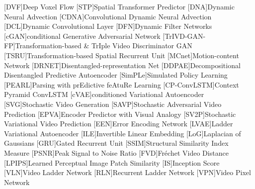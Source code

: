\begin{acronym}
    [DVF]{Deep Voxel Flow}
    [STP]{Spatial Transformer Predictor}
    [DNA]{Dynamic Neural Advection}
    [CDNA]{Convolutional Dynamic Neural Advection}
    [DCL]{Dynamic Convolutional Layer}
    [DFN]{Dynamic Filter Networks}
    [cGAN]{conditional Generative Adversarial Network}
    [TrIVD-GAN-FP]{Transformation-based \& TrIple Video Discriminator GAN}
    [TSRU]{Transformation-based Spatial Recurrent Unit}
    [MCnet]{Motion-content Network}
    [DRNET]{Disentangled-representation Net}
    [DDPAE]{Decompositional Disentangled Predictive Autoencoder}
    [SimPLe]{Simulated Policy Learning}
    [PEARL]{Parsing with prEdictive feAtuRe Learning}
    [CP-ConvLSTM]{Context Pyramid ConvLSTM}
    [cVAE]{conditioned Variational Autoencoder}
    [SVG]{Stochastic Video Generation}
    [SAVP]{Stochastic Adversarial Video Prediction}
    [EPVA]{Encoder Predictor with Visual Analogy}
    [SV2P]{Stochastic Variational Video Prediction}
    [EEN]{Error Encoding Network}
    [LVAE]{Ladder Variational Autoencoder}
    [ILE]{Invertible Linear Embedding}
    [LoG]{Laplacian of Gaussians}
    [GRU]{Gated Recurrent Unit}
    [SSIM]{Structural Similarity Index Measure}
    [PSNR]{Peak Signal to Noise Ratio}
    [FVD]{Fréchet Video Distance}
    [LPIPS]{Learned Perceptual Image Patch Similarity}
    [IS]{Inception Score}
    [VLN]{Video Ladder Network}
    [RLN]{Recurrent Ladder Network}
    [VPN]{Video Pixel Network}
\end{acronym}
